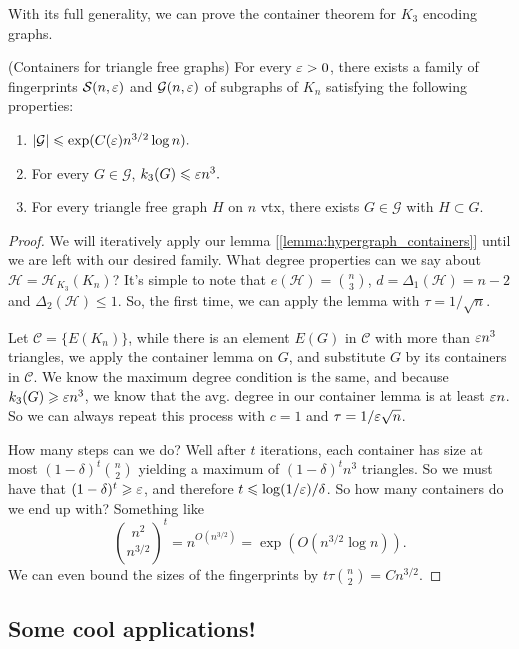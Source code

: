 With its full generality, we can prove the container theorem for
$K_3$ encoding graphs.
\begin{theorem}
	\label{trm:container_for_triangles}
	(Containers for triangle free graphs) For every $\varepsilon > 0$, there
	exists a family of fingerprints $\mathcal{S}(n,\varepsilon)$ and
	$\mathcal{G}(n,\varepsilon)$ of subgraphs of $K_n$ satisfying the following
	properties:
	\begin{enumerate}[label=(\alph*)]
		\item $|\mathcal{G}| \leqslant \exp(C(\varepsilon)n^{3/2}\log n).$
		\item For every $G \in \mathcal{G}$, $k_3(G) \leqslant \varepsilon n^3.$
		\item For every triangle free graph $H$ on $n$ vtx, there exists $G
			\in \mathcal{G}$ with $H \subset G$.
	\end{enumerate}
\end{theorem}

\begin{proof}
	We will iteratively apply our lemma
	[\ref{lemma:hypergraph_containers}] until we are left with our desired family.
	What degree properties can we say about $\mathcal{H} =
	\mathcal{H}_{K_3}(K_n)$? It's simple to note that $e(\mathcal{H}) =
	\binom{n}{3}$,
	$d = \Delta_1(\mathcal{H}) = n-2$ and $\Delta_2(\mathcal{H}) \leq 1$.
 So, the first time, we can apply the lemma with $\tau = 1/\sqrt{n}$.

	Let $\mathcal{C} = \{E(K_n)\}$, while there is an element $E(G)$ in
	$\mathcal{C}$ with more than $\varepsilon n^3$ triangles, we apply the
	container lemma on $G$, and substitute
	$G$ by its containers in $\mathcal{C}$. We know the maximum degree
	condition is the same, and because $k_3(G) \geqslant \varepsilon n^3$, we know
	that the avg. degree in our
	container lemma is at least $\varepsilon n$. So we can always repeat this
	process with $c = 1$ and $\tau = 1/\varepsilon \sqrt{n}$.

	How many steps can we do? Well after $t$ iterations, each container
	has size at most $(1-\delta)^t\binom{n}{2}$ yielding a maximum of
	$(1-\delta)^t n^3$ triangles.
	So we must have that $(1-\delta)^t \geqslant \varepsilon$, and therefore $t \leqslant
	\log(1/\varepsilon)/\delta$. So how many containers do we end up with? Something like
	\[
		\binom{n^2}{n^{3/2}}^t = n^{O(n^{3/2})} = \exp(O(n^{3/2}\log n)).
	\]
	We can even bound the sizes of the fingerprints by $t \tau
	\binom{n}{2} = Cn^{3/2}$.
\end{proof}

\subsection{Some cool applications!}

